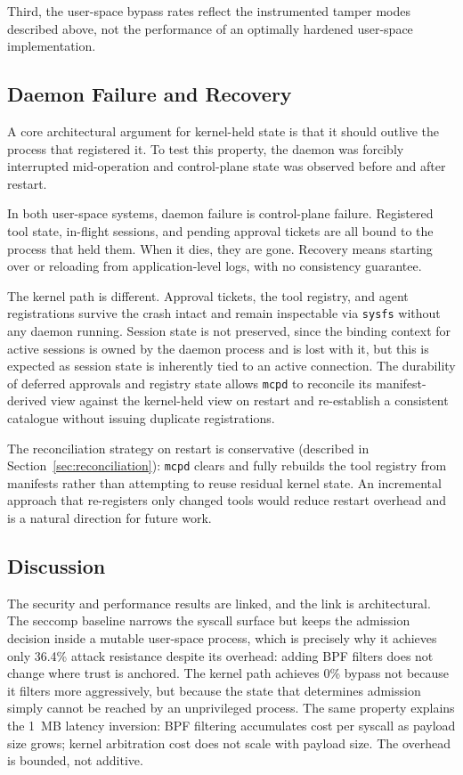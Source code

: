 Third, the user-space bypass rates reflect the instrumented tamper modes described above, not the performance of an optimally hardened user-space implementation.



\subsection{Daemon Failure and Recovery}
\label{sec:daemon-failure}

A core architectural argument for kernel-held state is that it should outlive the process that registered it.
To test this property, the daemon was forcibly interrupted mid-operation and control-plane state was observed before and after restart.

In both user-space systems, daemon failure is control-plane failure.
Registered tool state, in-flight sessions, and pending approval tickets are all bound to the process that held them.
When it dies, they are gone.
Recovery means starting over or reloading from application-level logs, with no consistency guarantee.

The kernel path is different.
Approval tickets, the tool registry, and agent registrations survive the crash intact and remain inspectable via \texttt{sysfs} without any daemon running.
Session state is not preserved, since the binding context for active sessions is owned by the daemon process and is lost with it, but this is expected as session state is inherently tied to an active connection.
The durability of deferred approvals and registry state allows \texttt{mcpd} to reconcile its manifest-derived view against the kernel-held view on restart and re-establish a consistent catalogue without issuing duplicate registrations.

The reconciliation strategy on restart is conservative (described in Section~\ref{sec:reconciliation}): \texttt{mcpd} clears and fully rebuilds the tool registry from manifests rather than attempting to reuse residual kernel state.
An incremental approach that re-registers only changed tools would reduce restart overhead and is a natural direction for future work.


\subsection{Discussion}

The security and performance results are linked, and the link is architectural.
The seccomp baseline narrows the syscall surface but keeps the admission decision inside a mutable user-space process, which is precisely why it achieves only 36.4\% attack resistance despite its overhead: adding BPF filters does not change where trust is anchored.
The kernel path achieves 0\% bypass not because it filters more aggressively, but because the state that determines admission simply cannot be reached by an unprivileged process.
The same property explains the 1~MB latency inversion: BPF filtering accumulates cost per syscall as payload size grows; kernel arbitration cost does not scale with payload size.
The overhead is bounded, not additive.

